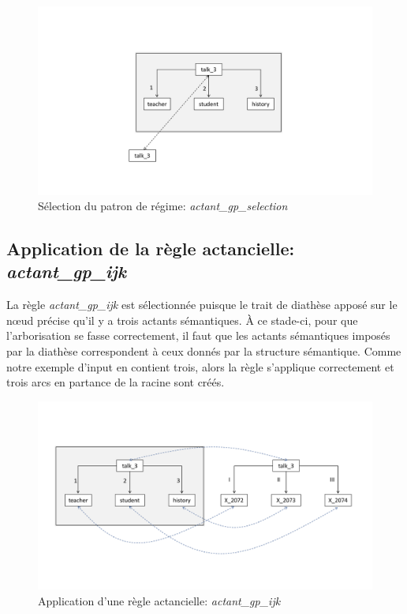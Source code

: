 \begin{figure}[htb]
	\centering
	\includegraphics[width=1\textwidth, trim = {0cm 3.4cm 0cm 4.5cm},clip]{ch6/figs/lexical_root_implem.pdf}
	\caption{Sélection du patron de régime: \emph{actant\_gp\_selection}}
	\label{deroulement1}
\end{figure}

\subsection{Application de la règle actancielle: \emph{actant\_gp\_ijk}}
La règle \emph{actant\_gp\_ijk} est sélectionnée puisque le trait de diathèse apposé sur le n\oe{}ud précise qu'il y a trois actants sémantiques. À ce stade-ci, pour que l'arborisation se fasse correctement, il faut que les actants sémantiques imposés par la diathèse correspondent à ceux donnés par la structure sémantique. Comme notre exemple d'input en contient trois, alors la règle s'applique correctement et trois arcs en partance de la racine sont créés.

\begin{figure}[htb]
	\centering
	\includegraphics[width=1\textwidth, trim = {0cm 3.6cm 0cm 4.5cm},clip]{ch6/figs/actant_gp_ijk.pdf}
	\caption{Application d'une règle actancielle: \emph{actant\_gp\_ijk}}
	\label{deroulement2}
\end{figure}

